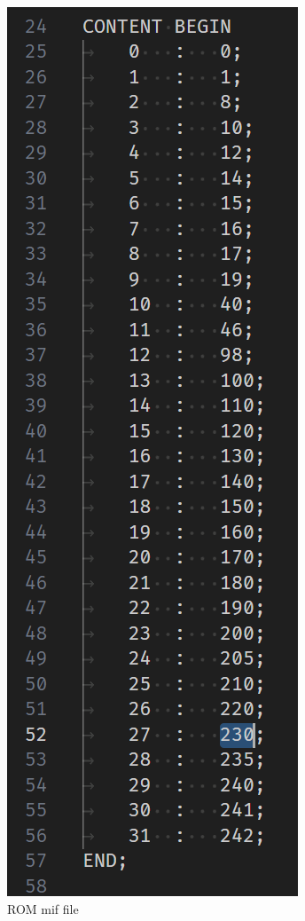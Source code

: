 \documentclass[11pt, titlepage]{article}
\begin{document}
            \begin{figure}[h]
                \centering
                \includegraphics[scale=0.4]{Images/rom data.png}
                \caption{ROM mif file}
            \end{figure}
\end{document}
